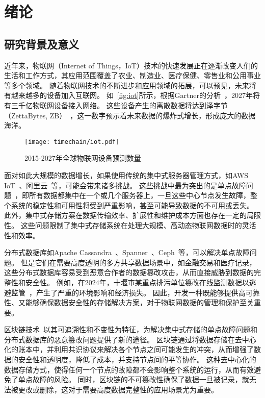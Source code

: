 
\chapter{绪论}
\section{研究背景及意义}
近年来，物联网（Internet of Things，IoT）技术的快速发展正在逐渐改变人们的生活和工作方式，其应用范围覆盖了农业、制造业、医疗保健、零售业和公用事业等多个领域。
随着物联网技术的不断进步和应用领域的拓展，可以预见，未来将有越来越多的设备加入互联网。
如~\autoref{fig:iot}所示，根据Gartner的分析~\cite{hung2017leading}，2027年将有三千亿物联网设备接入网络。
这些设备产生的离散数据将达到泽字节（ZettaBytes, ZB）~\cite{al2020internet}，这一数字预示着未来数据的爆炸式增长，形成庞大的数据海洋。

\begin{figure}[t]
    \centering
    \texttt{[image: timechain/iot.pdf]}
    \caption{2015-2027年全球物联网设备预测数量}
    \label{fig:iot}
\end{figure}

面对如此大规模的数据增长，如果使用传统的集中式服务器管理方式，如AWS IoT~\cite{aws}、阿里云~\cite{aliyun}等，可能会带来诸多挑战。
这些挑战中最为突出的是单点故障问题~\cite{gill2011understanding}，即所有数据都集中在一个或几个服务器上，一旦这些中心节点发生故障，整个系统的稳定性和可用性将受到严重影响，甚至可能导致数据的不可用或丢失。
此外，集中式存储方案在数据传输效率、扩展性和维护成本方面也存在一定的局限性。
这些问题限制了集中式存储系统在处理大规模、高动态物联网数据时的灵活性和效率。

分布式数据库如Apache Cassandra~\cite{lakshman2010cassandra}、Spanner~\cite{corbett2013spanner}、Ceph~\cite{weil2006ceph}等，可以解决单点故障问题。
但是它们在需要高度透明的多方共享数据场景中，如金融交易和医疗记录，这些分布式数据库容易受到恶意合作者的数据篡改攻击，从而直接威胁到数据的完整性和安全性。
例如，在2024年，十堰市某重点排污单位篡改在线监测数据以逃避监管~\cite{example}，产生了严重的环境影响和经济损失。
因此，开发一种既能够提供高可靠性、又能够确保数据安全性的存储解决方案，对于物联网数据的管理和保护至关重要。

区块链技术~\cite{houy2014bitcoin}以其可追溯性和不变性为特征，为解决集中式存储的单点故障问题和分布式数据库的恶意篡改问题提供了新的途径。
区块链通过将数据存储在去中心化的账本中，并利用共识协议来解决各个节点之间可能发生的冲突，从而增强了数据的安全性和透明度，降低了成本，并支持节点间的平等协作。
这种去中心化的数据存储方式，使得任何一个节点的故障都不会影响整个系统的运行，从而有效避免了单点故障的风险。
同时，区块链的不可篡改性确保了数据一旦被记录，就无法被更改或删除，这对于需要高度数据完整性的应用场景尤为重要。

